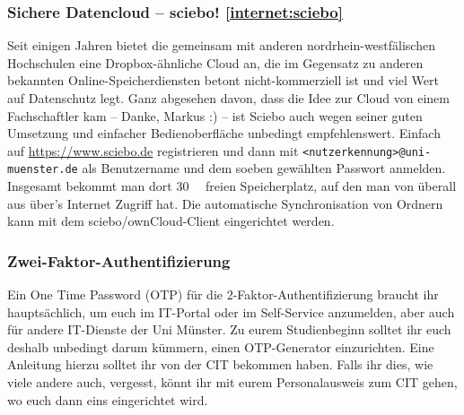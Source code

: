 \begin{multicols}{2}
\begin{figure}[t]
    \centering
\end{figure}


\subsubsection[Sichere Datencloud -- sciebo!]{Sichere Datencloud -- sciebo! \cref{internet:sciebo}}
Seit einigen Jahren bietet die \UniMuenster{} gemeinsam mit anderen nordrhein-westfälischen Hochschulen eine Dropbox-ähnliche Cloud an, die im Gegensatz zu anderen bekannten Online-Speicherdiensten betont nicht-kommerziell ist und viel Wert auf Datenschutz legt.
Ganz abgesehen davon, dass die Idee zur Cloud von einem Fachschaftler kam -- Danke, Markus :) -- ist Sciebo auch wegen seiner guten Umsetzung und einfacher Bedienoberfläche unbedingt empfehlenswert.
Einfach auf \url{https://www.sciebo.de} registrieren und dann mit \texttt{<nutzerkennung>@uni-muenster.de} als Benutzername und dem soeben gewählten Passwort anmelden.
Insgesamt bekommt man dort \SI{30}{\giga\byte} freien Speicherplatz, auf den man von überall aus über's Internet Zugriff hat.
Die automatische Synchronisation von Ordnern kann mit dem sciebo/ownCloud-Client eingerichtet werden.

\subsubsection{Zwei-Faktor-Authentifizierung}
Ein One Time Password (OTP) für die 2-Faktor-Authentifizierung braucht ihr hauptsächlich, um euch im IT-Portal oder im Self-Service anzumelden, aber auch für andere IT-Dienste der Uni Münster.
Zu eurem Studienbeginn solltet ihr euch deshalb unbedingt darum kümmern, einen OTP-Generator einzurichten.
Eine Anleitung hierzu solltet ihr von der CIT bekommen haben.
Falls ihr dies, wie viele andere auch, vergesst, könnt ihr mit eurem Personalausweis zum CIT gehen, wo euch dann eins eingerichtet wird. 


\end{multicols}

